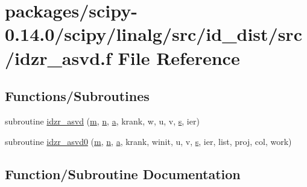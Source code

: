 \hypertarget{idzr__asvd_8f}{}\section{packages/scipy-\/0.14.0/scipy/linalg/src/id\+\_\+dist/src/idzr\+\_\+asvd.f File Reference}
\label{idzr__asvd_8f}
\subsection*{Functions/\+Subroutines}
\begin{DoxyCompactItemize}
\item 
subroutine \hyperlink{idzr__asvd_8f_acb8e2acb481a922bfef1adc1afbc6a7a}{idzr\+\_\+asvd} (\hyperlink{indexexpr_8h_ab72fdb4031d47b75ab26dd18a437bcdc}{m}, \hyperlink{indexexpr_8h_ab427e2e2b4d6cec55fa088ea2a692ace}{n}, \hyperlink{gen__mat5files_8m_aae328bf20413f220e38aec4d95bfd6da}{a}, krank, w, u, v, \hyperlink{indexexpr_8h_ae024b0db549122b44c349ae28ec990dc}{s}, ier)
\item 
subroutine \hyperlink{idzr__asvd_8f_a3eee0113830d716019f2d392e4aa8e00}{idzr\+\_\+asvd0} (\hyperlink{indexexpr_8h_ab72fdb4031d47b75ab26dd18a437bcdc}{m}, \hyperlink{indexexpr_8h_ab427e2e2b4d6cec55fa088ea2a692ace}{n}, \hyperlink{gen__mat5files_8m_aae328bf20413f220e38aec4d95bfd6da}{a}, krank, winit, u, v, \hyperlink{indexexpr_8h_ae024b0db549122b44c349ae28ec990dc}{s}, ier, list, proj, col, work)
\end{DoxyCompactItemize}


\subsection{Function/\+Subroutine Documentation}
\hypertarget{idzr__asvd_8f_acb8e2acb481a922bfef1adc1afbc6a7a}{}
